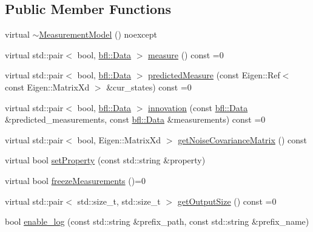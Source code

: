 \subsection*{Public Member Functions}
\begin{DoxyCompactItemize}
\item 
virtual \mbox{\hyperlink{classbfl_1_1MeasurementModel_a2c8f522d69f61c99e44093ef08114760}{$\sim$\+Measurement\+Model}} () noexcept
\item 
virtual std\+::pair$<$ bool, \mbox{\hyperlink{namespacebfl_af6b103c6821db1b54452f776fdd9dd02}{bfl\+::\+Data}} $>$ \mbox{\hyperlink{classbfl_1_1MeasurementModel_ad372b720cef4e6bc0ac2489f4098bfc9}{measure}} () const =0
\item 
virtual std\+::pair$<$ bool, \mbox{\hyperlink{namespacebfl_af6b103c6821db1b54452f776fdd9dd02}{bfl\+::\+Data}} $>$ \mbox{\hyperlink{classbfl_1_1MeasurementModel_a8fc8798aa2db48f428d4ce59b33b5307}{predicted\+Measure}} (const Eigen\+::\+Ref$<$ const Eigen\+::\+Matrix\+Xd $>$ \&cur\+\_\+states) const =0
\item 
virtual std\+::pair$<$ bool, \mbox{\hyperlink{namespacebfl_af6b103c6821db1b54452f776fdd9dd02}{bfl\+::\+Data}} $>$ \mbox{\hyperlink{classbfl_1_1MeasurementModel_aa06e0643805551a981bcc013ad44c829}{innovation}} (const \mbox{\hyperlink{namespacebfl_af6b103c6821db1b54452f776fdd9dd02}{bfl\+::\+Data}} \&predicted\+\_\+measurements, const \mbox{\hyperlink{namespacebfl_af6b103c6821db1b54452f776fdd9dd02}{bfl\+::\+Data}} \&measurements) const =0
\item 
virtual std\+::pair$<$ bool, Eigen\+::\+Matrix\+Xd $>$ \mbox{\hyperlink{classbfl_1_1MeasurementModel_af25f42076b69e0c6cab47d36d796536f}{get\+Noise\+Covariance\+Matrix}} () const
\item 
virtual bool \mbox{\hyperlink{classbfl_1_1MeasurementModel_af97e18b52d1a3f365dd5982b8cc4aff7}{set\+Property}} (const std\+::string \&property)
\item 
virtual bool \mbox{\hyperlink{classbfl_1_1MeasurementModel_a67ef096c5b3682252582aec75498089d}{freeze\+Measurements}} ()=0
\item 
virtual std\+::pair$<$ std\+::size\+\_\+t, std\+::size\+\_\+t $>$ \mbox{\hyperlink{classbfl_1_1MeasurementModel_a6cca2022b576c9dbb61e73b83a10c6ee}{get\+Output\+Size}} () const =0
\item 
bool \mbox{\hyperlink{classbfl_1_1Logger_ae94b97b6e8d7902e8ce048384813122e}{enable\+\_\+log}} (const std\+::string \&prefix\+\_\+path, const std\+::string \&prefix\+\_\+name)
\item 

\end{DoxyCompactItemize}
